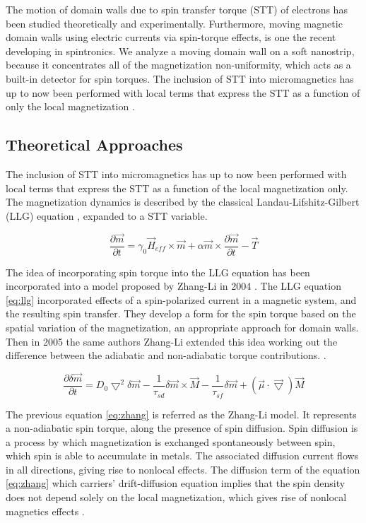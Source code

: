 The motion of domain walls due to spin transfer torque (STT) of electrons has been studied theoretically and experimentally. Furthermore, moving magnetic domain walls using electric currents via spin-torque effects, is one the recent developing in spintronics. We analyze a moving domain wall on a soft nanostrip, because it concentrates all of the magnetization non-uniformity, which acts as a built-in detector for spin torques. The inclusion of STT into micromagnetics has up to now been performed with local terms that express the STT as a function of only the local magnetization \cite{claudio}.
 
\subsection{Theoretical Approaches}

The inclusion of STT into micromagnetics has up to now been performed with local terms that express the STT as a function of the local magnetization only. The magnetization dynamics is described by the classical Landau-Lifshitz-Gilbert (LLG) equation \cite{claudio}, expanded to a STT variable. 

\begin{equation}  \label{eq:llg}
	\frac{\partial \vec{m}}{\partial t} = \gamma_0\vec{H}_{eff} \times \vec{m} + \alpha \vec{m} \times \frac{\partial \vec{m}}{\partial t} - \vec{T}
\end{equation}

The idea of incorporating spin torque into the LLG equation has been incorporated into a model proposed by Zhang-Li in 2004 \cite{zhang2004}. The LLG equation \ref{eq:llg} incorporated effects of a spin-polarized current in a magnetic system, and the resulting spin transfer. They develop a form for the spin torque based on the spatial variation of the magnetization, an appropriate approach for domain walls. Then in 2005 the same authors Zhang-Li extended this idea working out the difference between the adiabatic and non-adiabatic torque contributions. \cite{zhang}.

\begin{equation} \label{eq:zhang}
 \frac{\partial \delta \vec{m} }{\partial t} =  D_{0}\bigtriangledown^{2} \delta \vec{m} - \frac{1}{\tau_{sd}} \delta \vec{m} \times \vec{M} - \frac{1}{\tau_{sf}}\delta \vec{m} +(\vec{\mu} \cdot\vec{\bigtriangledown} )\vec{M}
\end{equation}

The previous equation \ref{eq:zhang} is referred as the Zhang-Li model. It represents a non-adiabatic spin torque, along the presence of spin diffusion. Spin diffusion is a process by which magnetization is exchanged spontaneously between spin, which spin is able to accumulate in metals. The associated diffusion current flows in all directions, giving rise to nonlocal effects. The diffusion term of the equation \ref{eq:zhang} which carriers’ drift-diffusion equation implies that the spin density does not depend solely on the local magnetization, which gives rise of nonlocal magnetics effects \cite{claudio}. 

